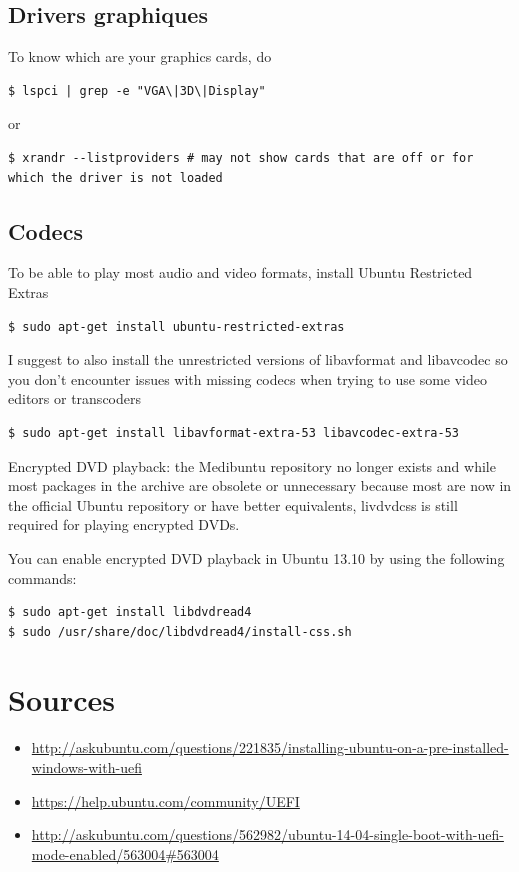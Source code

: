 \documentclass{../guide}
\begin{document}
\subsection{Drivers graphiques}
To know which are your graphics cards, do
\begin{verbatim}
$ lspci | grep -e "VGA\|3D\|Display"
\end{verbatim}
or
\begin{verbatim}
$ xrandr --listproviders # may not show cards that are off or for which the driver is not loaded
\end{verbatim}

\subsection{Codecs}
To be able to play most audio and video formats, install Ubuntu Restricted Extras
\begin{verbatim}
$ sudo apt-get install ubuntu-restricted-extras
\end{verbatim}

I suggest to also install the unrestricted versions of libavformat and libavcodec so you don't encounter issues with missing codecs when trying to use some video editors or transcoders
\begin{verbatim}
$ sudo apt-get install libavformat-extra-53 libavcodec-extra-53
\end{verbatim}

Encrypted DVD playback: the Medibuntu repository no longer exists and while most packages in the archive are obsolete or unnecessary because most are now in the official Ubuntu repository or have better equivalents, livdvdcss is still required for playing encrypted DVDs.

You can enable encrypted DVD playback in Ubuntu 13.10 by using the following commands:
\begin{verbatim}
$ sudo apt-get install libdvdread4
$ sudo /usr/share/doc/libdvdread4/install-css.sh
\end{verbatim}


\section*{Sources}
\begin{itemize}
  \item \url{http://askubuntu.com/questions/221835/installing-ubuntu-on-a-pre-installed-windows-with-uefi}
  \item \url{https://help.ubuntu.com/community/UEFI}
  \item \url{http://askubuntu.com/questions/562982/ubuntu-14-04-single-boot-with-uefi-mode-enabled/563004#563004}
\end{itemize}
\end{document}
